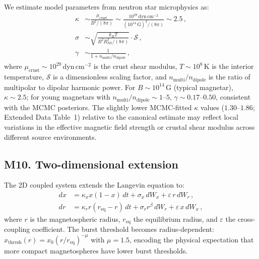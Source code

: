 We estimate model parameters from neutron star microphysics as:
\begin{align}
\kappa &\sim \frac{\mu_{\mathrm{crust}}}{B^2/(8\pi)} \sim \frac{10^{29}\,\mathrm{dyn\,cm^{-2}}}{(10^{14}\,\mathrm{G})^2/(8\pi)} \sim 2.5\,,
\tag{M9}\\
\sigma &\sim \sqrt{\frac{k_B T}{B^2 R_{\mathrm{NS}}^3 /(8\pi)}} \cdot \mathcal{S}\,,
\tag{M10}\\
\gamma &\sim \frac{1}{1 + n_{\mathrm{multi}}/n_{\mathrm{dipole}}}\,,
\tag{M11}
\end{align}
where $\mu_{\mathrm{crust}} \sim 10^{29}$\,dyn\,cm$^{-2}$ is the crust shear modulus, $T \sim 10^8$\,K is the interior temperature, $\mathcal{S}$ is a dimensionless scaling factor, and $n_{\mathrm{multi}}/n_{\mathrm{dipole}}$ is the ratio of multipolar to dipolar harmonic power. For $B \sim 10^{14}$\,G (typical magnetar), $\kappa \sim 2.5$; for young magnetars with $n_{\mathrm{multi}}/n_{\mathrm{dipole}} \sim 1$--$5$, $\gamma \sim 0.17$--$0.50$, consistent with the MCMC posteriors. The slightly lower MCMC-fitted $\kappa$ values ($1.30$--$1.86$; Extended Data Table~1) relative to the canonical estimate may reflect local variations in the effective magnetic field strength or crustal shear modulus across different source environments.

\subsection*{M10. Two-dimensional extension}

The 2D coupled system extends the Langevin equation to:
\begin{align}
dx &= \kappa_x x(1-x)\,dt + \sigma_x\,dW_x + \varepsilon\,r\,dW_r\,,
\tag{M12}\\
dr &= \kappa_r r(r_{\mathrm{eq}} - r)\,dt + \sigma_r r^\beta\,dW_r + \varepsilon\,x\,dW_x\,,
\tag{M13}
\end{align}
where $r$ is the magnetospheric radius, $r_{\mathrm{eq}}$ the equilibrium radius, and $\varepsilon$ the cross-coupling coefficient. The burst threshold becomes radius-dependent: $x_{\mathrm{thresh}}(r) = x_0(r/r_{\mathrm{eq}})^{-\mu}$ with $\mu = 1.5$, encoding the physical expectation that more compact magnetospheres have lower burst thresholds.
